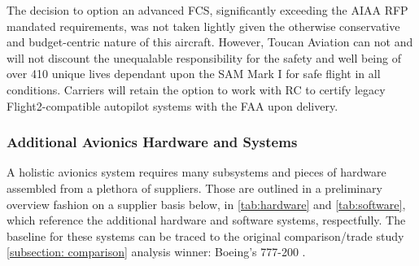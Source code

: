 The decision to option an advanced FCS, significantly exceeding the AIAA RFP \cite{RFP} mandated requirements, was not taken lightly given the otherwise conservative and budget-centric nature of this aircraft. However, Toucan Aviation can not and will not discount the unequalable responsibility for the safety and well being of over 410 unique lives dependant upon the SAM Mark I for safe flight in all conditions.  Carriers will retain the option to work with RC to certify legacy Flight2-compatible autopilot systems with the FAA upon delivery.   

\subsubsection{Additional Avionics Hardware and Systems}

A holistic avionics system requires many subsystems and pieces of hardware assembled from a plethora of suppliers.  Those are outlined in a preliminary overview fashion on a supplier basis below, in \ref{tab:hardware} and \ref{tab:software}, which reference the additional hardware and software systems, respectfully.  The baseline for these systems can be traced to the original comparison/trade study \ref{subsection: comparison} analysis winner: Boeing's 777-200 \cite{suppliers}.

